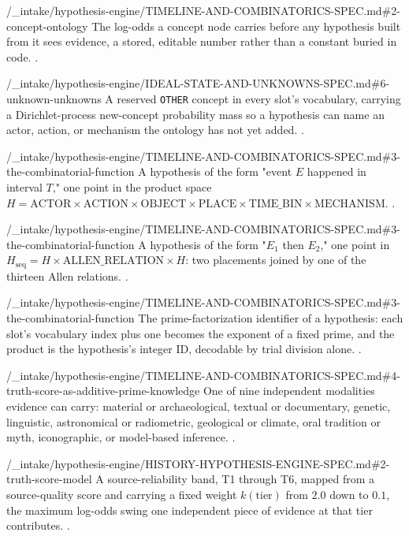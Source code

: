 %
  {\bktrepo/_intake/hypothesis-engine/TIMELINE-AND-COMBINATORICS-SPEC.md\#2-concept-ontology}%
  {The log-odds a concept node carries before any hypothesis built from it
   sees evidence, a stored, editable number rather than a constant buried
   in code. .}

%
  {\bktrepo/_intake/hypothesis-engine/IDEAL-STATE-AND-UNKNOWNS-SPEC.md\#6-unknown-unknowns}%
  {A reserved \texttt{OTHER} concept in every slot's vocabulary, carrying a
   Dirichlet-process new-concept probability mass so a hypothesis can name
   an actor, action, or mechanism the ontology has not yet added.
   .}

%
  {\bktrepo/_intake/hypothesis-engine/TIMELINE-AND-COMBINATORICS-SPEC.md\#3-the-combinatorial-function}%
  {A hypothesis of the form "event $E$ happened in interval $T$," one point
   in the product space $H = \text{ACTOR} \times \text{ACTION} \times
   \text{OBJECT} \times \text{PLACE} \times \text{TIME\_BIN} \times
   \text{MECHANISM}$. .}

%
  {\bktrepo/_intake/hypothesis-engine/TIMELINE-AND-COMBINATORICS-SPEC.md\#3-the-combinatorial-function}%
  {A hypothesis of the form "$E_1$ then $E_2$," one point in $H_{\mathrm{seq}}
   = H \times \text{ALLEN\_RELATION} \times H$: two placements joined by one
   of the thirteen Allen relations. .}

%
  {\bktrepo/_intake/hypothesis-engine/TIMELINE-AND-COMBINATORICS-SPEC.md\#3-the-combinatorial-function}%
  {The prime-factorization identifier of a hypothesis: each slot's
   vocabulary index plus one becomes the exponent of a fixed prime, and the
   product is the hypothesis's integer ID, decodable by trial division
   alone. .}

%
  {\bktrepo/_intake/hypothesis-engine/TIMELINE-AND-COMBINATORICS-SPEC.md\#4-truth-score-as-additive-prime-knowledge}%
  {One of nine independent modalities evidence can carry: material or
   archaeological, textual or documentary, genetic, linguistic, astronomical
   or radiometric, geological or climate, oral tradition or myth,
   iconographic, or model-based inference. .}

%
  {\bktrepo/_intake/hypothesis-engine/HISTORY-HYPOTHESIS-ENGINE-SPEC.md\#2-truth-score-model}%
  {A source-reliability band, T1 through T6, mapped from a source-quality
   score and carrying a fixed weight $k(\text{tier})$ from $2.0$ down to
   $0.1$, the maximum log-odds swing one independent piece of evidence at
   that tier contributes. .}

